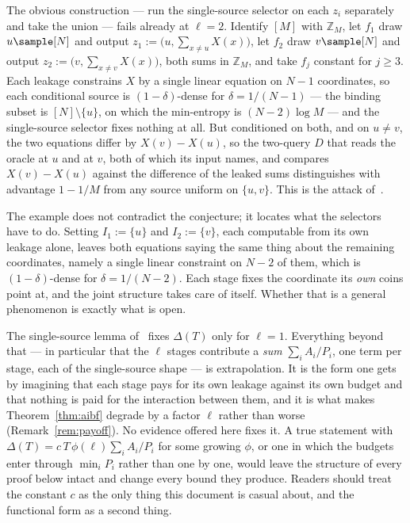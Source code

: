 \documentclass{conjura-conjecture}
\begin{document}
\begin{remark}
\label{rem:separate}
The obvious construction --- run the single-source selector on each $z_i$
separately and take the union --- fails already at $\ell = 2$. Identify
$[M]$ with $\mathbb{Z}_M$, let $f_1$ draw $u \sample [N]$ and output
$z_1 := \bigl(u, \sum_{x \ne u} X(x)\bigr)$, let $f_2$ draw
$v \sample [N]$ and output $z_2 := \bigl(v, \sum_{x \ne v} X(x)\bigr)$,
both sums in $\mathbb{Z}_M$, and take $f_j$ constant for $j \ge 3$. Each
leakage constrains $X$ by a single linear equation on $N-1$ coordinates,
so each conditional source is $(1-\delta)$-dense for $\delta = 1/(N-1)$ ---
the binding subset is $[N]\setminus\{u\}$, on which the min-entropy is
$(N-2)\log M$ --- and the single-source selector fixes nothing at all. But
conditioned on both, and on $u \ne v$, the two equations differ by
$X(v)-X(u)$, so the two-query $D$ that reads the oracle at $u$ and at $v$,
both of which its input names, and compares $X(v)-X(u)$ against the
difference of the leaked sums distinguishes with advantage $1-1/M$ from
any source uniform on $\{u,v\}$. This is the attack
of~\cite[\S1.4]{CFHS}.

The example does not contradict the conjecture; it locates what the
selectors have to do. Setting $I_1 := \{u\}$ and $I_2 := \{v\}$, each
computable from its own leakage alone, leaves both equations saying the
same thing about the remaining coordinates, namely a single linear
constraint on $N-2$ of them, which is $(1-\delta)$-dense for
$\delta = 1/(N-2)$. Each stage fixes the coordinate its \emph{own} coins
point at, and the joint structure takes care of itself. Whether that is a
general phenomenon is exactly what is open.
\end{remark}

\begin{remark}\label{rem:shape}
The single-source lemma of~\cite{CDGS} fixes $\Delta(T)$ only for
$\ell = 1$. Everything beyond that --- in particular that the $\ell$
stages contribute a \emph{sum} $\sum_i A_i/P_i$, one term per stage, each
of the single-source shape --- is extrapolation. It is the form one gets
by imagining that each stage pays for its own leakage against its own
budget and that nothing is paid for the interaction between them, and it
is what makes Theorem~\ref{thm:aibf} degrade by a factor $\ell$ rather
than worse (Remark~\ref{rem:payoff}). No evidence offered here fixes it. A
true statement with $\Delta(T) = c\,T\,\phi(\ell)\sum_i A_i/P_i$ for some
growing $\phi$, or one in which the budgets enter through $\min_i P_i$
rather than one by one, would leave the structure of every proof below
intact and change every bound they produce. Readers should treat the
constant $c$ as the only thing this document is casual about, and the
functional form as a second thing.
\end{remark}
\end{document}
